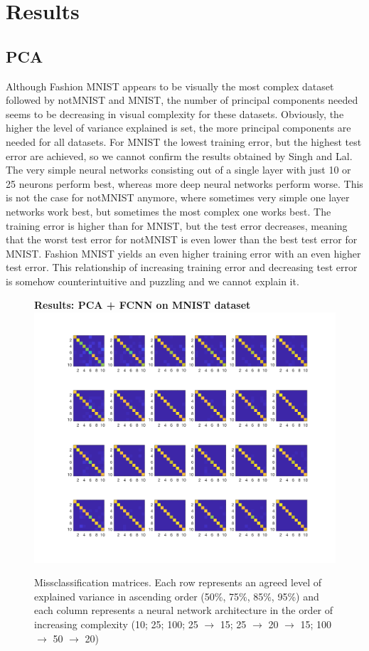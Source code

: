 \documentclass[letterpaper,12pt]{article}
\begin{document}
\section{Results}

\subsection*{PCA}
Although Fashion MNIST appears to be visually the most complex dataset followed by notMNIST and MNIST, the number of principal components needed seems to be decreasing in visual complexity for these datasets. Obviously, the higher the level of variance explained is set, the more principal components are needed for all datasets. For MNIST the lowest training error, but the highest test error are achieved, so we cannot confirm the results obtained by Singh and Lal. The very simple neural networks consisting out of a single layer with just 10 or 25 neurons perform best, whereas more deep neural networks perform worse. This is not the case for notMNIST anymore, where sometimes very simple one layer networks work best, but sometimes the most complex one works best. The training error is higher than for MNIST, but the test error decreases, meaning that the worst test error for notMNIST is even lower than the best test error for MNIST. Fashion MNIST yields an even higher training error with an even higher test error. This relationship of increasing training error and decreasing test error is somehow counterintuitive and puzzling and we cannot explain it.  

\begin{figure}[p]
\centering
\textbf{Results: PCA + FCNN on MNIST dataset}
  \includegraphics[width=0.9\linewidth]{PCA_1DNN_MNIST}
\caption{Missclassification matrices. Each row represents an agreed level of explained variance in ascending order (50\%, 75\%, 85\%, 95\%) and each column represents a neural network architecture in the order of increasing complexity (10; 25; 100; 25 $\rightarrow$ 15; 25 $\rightarrow$ 20 $\rightarrow$ 15; 100 $\rightarrow$ 50 $\rightarrow$ 20)}
\label{fig:PCA_1DNN_MNIST}
\end{figure}
\end{document}
